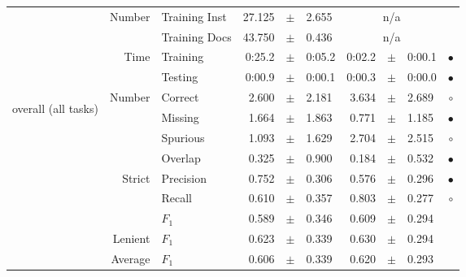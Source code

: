 \begin{longtable}{|r|r|l||rcl|rcl|c|}
\cline{2-10} & \multirow{2}{*}{    Number} &   Training Inst &      27.125 &  $\pm$  &       2.655 &    \multicolumn{3}{c|}{n/a}         &  \\
\cline{3-10} &                             &   Training Docs &      43.750 &  $\pm$  &       0.436 &    \multicolumn{3}{c|}{n/a}         &  \\
\cline{2-10} & \multirow{2}{*}{      Time} &        Training &      0:25.2 &  $\pm$  &      0:05.2 &      0:02.2 &  $\pm$  &      0:00.1 & $\bullet$ \\
\cline{3-10} &                             &         Testing &      0:00.9 &  $\pm$  &      0:00.1 &      0:00.3 &  $\pm$  &      0:00.0 & $\bullet$ \\
\hline
\hline
\multirow{11}{*}{\begin{sideways}overall (all tasks)\end{sideways} }
             & \multirow{4}{*}{    Number} &         Correct &       2.600 &  $\pm$  &       2.181 &       3.634 &  $\pm$  &       2.689 & $\circ$ \\
\cline{3-10} &                             &         Missing &       1.664 &  $\pm$  &       1.863 &       0.771 &  $\pm$  &       1.185 & $\bullet$ \\
\cline{3-10} &                             &        Spurious &       1.093 &  $\pm$  &       1.629 &       2.704 &  $\pm$  &       2.515 & $\circ$ \\
\cline{3-10} &                             &         Overlap &       0.325 &  $\pm$  &       0.900 &       0.184 &  $\pm$  &       0.532 & $\bullet$ \\
\cline{2-10} & \multirow{3}{*}{    Strict} &       Precision &       0.752 &  $\pm$  &       0.306 &       0.576 &  $\pm$  &       0.296 & $\bullet$ \\
\cline{3-10} &                             &          Recall &       0.610 &  $\pm$  &       0.357 &       0.803 &  $\pm$  &       0.277 & $\circ$ \\
\cline{3-10} &                             &           $F_1$ &       0.589 &  $\pm$  &       0.346 &       0.609 &  $\pm$  &       0.294 &  \\
\cline{2-10} &                     Lenient &           $F_1$ &       0.623 &  $\pm$  &       0.339 &       0.630 &  $\pm$  &       0.294 &  \\
\cline{2-10} &                     Average &           $F_1$ &       0.606 &  $\pm$  &       0.339 &       0.620 &  $\pm$  &       0.293 &  \\

\end{longtable}
